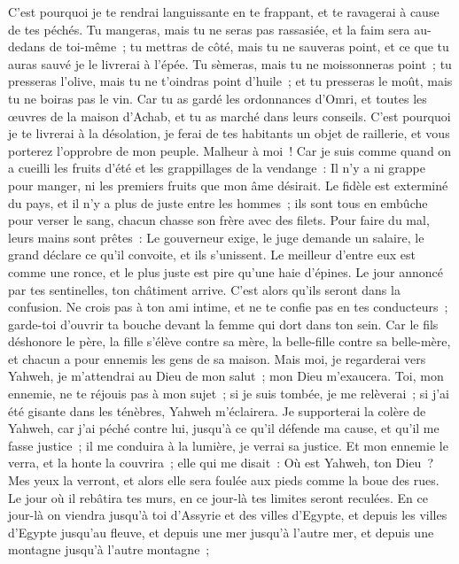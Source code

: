 \begin{multicols}{2}
C'est pourquoi je te rendrai languissante en te frappant, et te ravagerai à cause de tes péchés.
Tu mangeras, mais tu ne seras pas rassasiée, et la faim sera au-dedans de toi-même~; tu mettras de côté, mais tu ne sauveras point, et ce que tu auras sauvé je le livrerai à l'épée.
Tu sèmeras, mais tu ne moissonneras point~; tu presseras l'olive, mais tu ne t'oindras point d'huile~; et tu presseras le moût, mais tu ne boiras pas le vin.
Car tu as gardé les ordonnances d'Omri, et toutes les œuvres de la maison d'Achab, et tu as marché dans leurs conseils. C'est pourquoi je te livrerai à la désolation, je ferai de tes habitants un objet de raillerie, et vous porterez l'opprobre de mon peuple.
\VerseOne{}Malheur à moi~! Car je suis comme quand on a cueilli les fruits d'été et les grappillages de la vendange~: Il n'y a ni grappe pour manger, ni les premiers fruits que mon âme désirait.
Le fidèle est exterminé du pays, et il n'y a plus de juste entre les hommes~; ils sont tous en embûche pour verser le sang, chacun chasse son frère avec des filets.
Pour faire du mal, leurs mains sont prêtes~: Le gouverneur exige, le juge demande un salaire, le grand déclare ce qu'il convoite, et ils s'unissent.
Le meilleur d'entre eux est comme une ronce, et le plus juste est pire qu'une haie d'épines. Le jour annoncé par tes sentinelles, ton châtiment arrive. C'est alors qu'ils seront dans la confusion.
Ne crois pas à ton ami intime, et ne te confie pas en tes conducteurs~; garde-toi d'ouvrir ta bouche devant la femme qui dort dans ton sein.
Car le fils déshonore le père, la fille s'élève contre sa mère, la belle-fille contre sa belle-mère, et chacun a pour ennemis les gens de sa maison.
Mais moi, je regarderai vers Yahweh, je m'attendrai au Dieu de mon salut~; mon Dieu m'exaucera.
Toi, mon ennemie, ne te réjouis pas à mon sujet~; si je suis tombée, je me relèverai~; si j'ai été gisante dans les ténèbres, Yahweh m'éclairera.
Je supporterai la colère de Yahweh, car j'ai péché contre lui, jusqu'à ce qu'il défende ma cause, et qu'il me fasse justice~; il me conduira à la lumière, je verrai sa justice.
Et mon ennemie le verra, et la honte la couvrira~; elle qui me disait~: Où est Yahweh, ton Dieu~? Mes yeux la verront, et alors elle sera foulée aux pieds comme la boue des rues.
Le jour où il rebâtira tes murs, en ce jour-là tes limites seront reculées.
En ce jour-là on viendra jusqu'à toi d'Assyrie et des villes d'Egypte, et depuis les villes d'Egypte jusqu'au fleuve, et depuis une mer jusqu'à l'autre mer, et depuis une montagne jusqu'à l'autre montagne~;

\end{multicols}
